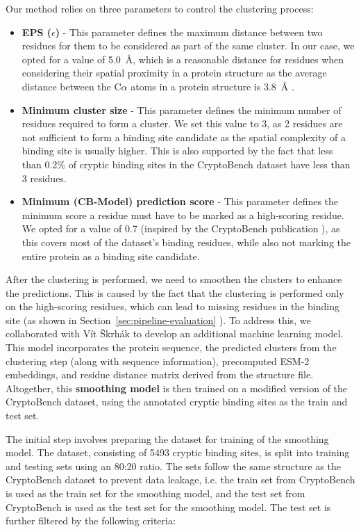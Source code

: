 Our method relies on three parameters to control the clustering process:
\begin{itemize}
    \item \textbf{EPS ($\epsilon$)} - This parameter defines the maximum distance between two residues for them to be considered as part of the same cluster. In our case, we opted for a value of 5.0~\AA, which is a reasonable distance for residues when considering their spatial proximity in a protein structure as the average distance between the C$\alpha$ atoms in a protein structure is 3.8~\AA{} \cite{creighton1993proteins}.
    \item \textbf{Minimum cluster size} - This parameter defines the minimum number of residues required to form a cluster. We set this value to 3, as 2 residues are not sufficient to form a binding site candidate as the spatial complexity of a binding site is usually higher. This is also supported by the fact that less than 0.2\% of cryptic binding sites in the CryptoBench dataset have less than 3 residues.
    \item \textbf{Minimum (CB-Model) prediction score} - This parameter defines the minimum score a residue must have to be marked as a high-scoring residue. We opted for a value of 0.7 (inspired by the CryptoBench publication \cite{vskrhak2025cryptobench}), as this covers most of the dataset's binding residues, while also not marking the entire protein as a binding site candidate.
\end{itemize}

After the clustering is performed, we need to smoothen the clusters to enhance the predictions. This is caused by the fact that the clustering is performed only on the high-scoring residues, which can lead to missing residues in the binding site (as shown in Section~\ref{sec:pipeline-evaluation} ). To address this, we collaborated with Vít Škrhák to develop an additional machine learning model. This model incorporates the protein sequence, the predicted clusters from the clustering step (along with sequence information), precomputed ESM-2 embeddings, and residue distance matrix derived from the structure file. Altogether, this \textbf{smoothing model} is then trained on a modified version of the CryptoBench dataset, using the annotated cryptic binding sites as the train and test set.

The initial step involves preparing the dataset for training of the smoothing model. The dataset, consisting of 5493 cryptic binding sites, is split into training and testing sets using an 80:20 ratio. The sets follow the same structure as the CryptoBench dataset to prevent data leakage, i.e. the train set from CryptoBench is used as the train set for the smoothing model, and the test set from CryptoBench is used as the test set for the smoothing model. The test set is further filtered by the following criteria:

